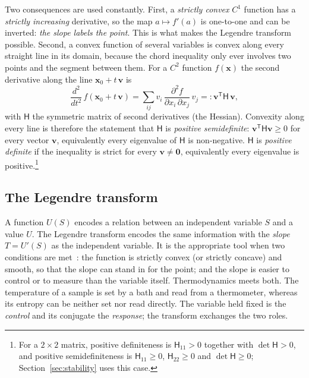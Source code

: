 \documentclass[10pt,a4paper]{article}
\theoremstyle{remark}
\begin{document}
Two consequences are used constantly. First, a \emph{strictly convex} $C^{1}$
function has a \emph{strictly increasing} derivative, so the map $a\mapsto f'(a)$ is
one-to-one and can be inverted: \emph{the slope labels the point}. This is what
makes the Legendre transform possible. Second, a convex function of several
variables is convex along every straight line in its domain, because the chord
inequality only ever involves two points and the segment between them. For a
$C^{2}$ function $f(\mathbf{x})$ the second derivative along the line
$\mathbf{x}_0+t\,\mathbf{v}$ is
\[
  \frac{d^{2}}{dt^{2}}\,f(\mathbf{x}_0+t\,\mathbf{v})
  =\sum_{ij}v_i\,\frac{\partial^{2}f}{\partial x_i\,\partial x_j}\,v_j
  =:\mathbf{v}^{\mathsf T}\mathsf{H}\,\mathbf{v} ,
\]
with $\mathsf{H}$ the symmetric matrix of second derivatives (the Hessian).
Convexity along every line is therefore the statement that $\mathsf{H}$ is
\emph{positive semidefinite}: $\mathbf{v}^{\mathsf T}\mathsf{H}\mathbf{v}\geq0$
for every vector $\mathbf{v}$, equivalently every eigenvalue of $\mathsf{H}$
is non-negative. $\mathsf{H}$ is \emph{positive definite} if the inequality
is strict for every $\mathbf{v}\neq\mathbf{0}$, equivalently every eigenvalue
is positive.\footnote{For a $2\times2$ matrix, positive definiteness is
$\mathsf{H}_{11}>0$ together with $\det\mathsf{H}>0$, and positive
semidefiniteness is $\mathsf{H}_{11}\geq0$, $\mathsf{H}_{22}\geq0$ and
$\det\mathsf{H}\geq0$; Section~\ref{sec:stability} uses this case.}

\subsection{The Legendre transform}
\label{sec:legendre}

A function $U(S)$ encodes a relation between an independent variable $S$ and a
value $U$. The Legendre transform encodes the same information with the
\emph{slope} $T=U'(S)$ as the independent variable. It is the appropriate tool
when two conditions are met~\cite{Zia}: the function is strictly convex (or
strictly concave) and smooth, so that the slope can stand in for the point;
and the slope is easier to control or to measure than the variable itself.
Thermodynamics meets both. The temperature of a sample is set by a bath and
read from a thermometer, whereas its entropy can be neither set nor read
directly. The variable held fixed is the \emph{control} and its conjugate the
\emph{response}; the transform exchanges the two roles.
\end{document}
